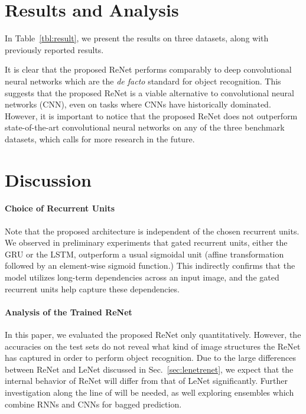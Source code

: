 \section{Results and Analysis}

In Table~\ref{tbl:result}, we present the results on three datasets,
along with previously reported results.

It is clear that the proposed ReNet performs comparably to deep convolutional
neural networks which are the {\it de facto} standard for object recognition.
This suggests that the proposed ReNet is a viable alternative to convolutional
neural networks (CNN), even on tasks where CNNs have historically dominated.
However, it is important to notice that the proposed ReNet does not outperform
state-of-the-art convolutional neural networks on any of the three benchmark
datasets, which calls for more research in the future.

\section{Discussion}

\paragraph{Choice of Recurrent Units}
Note that the proposed architecture is independent of the chosen recurrent
units. We observed in preliminary experiments that gated
recurrent units, either the GRU or the LSTM, outperform a usual sigmoidal unit
(affine transformation followed by an element-wise sigmoid function.) This
indirectly confirms that the model utilizes long-term dependencies across an
input image, and the gated recurrent units help capture these dependencies.

\paragraph{Analysis of the Trained ReNet}
In this paper, we evaluated the proposed ReNet only quantitatively. However, the
accuracies on the test sets do not reveal what kind of image structures the
ReNet has captured in order to perform object recognition. Due to the large
differences between ReNet and LeNet discussed in
Sec.~\ref{sec:lenetrenet}, we expect that the internal behavior of ReNet
will differ from that of LeNet significantly. Further investigation along
the line of \citep{ZeilerFergus14} will be needed, as well exploring ensembles
which combine RNNs and CNNs for bagged prediction.

